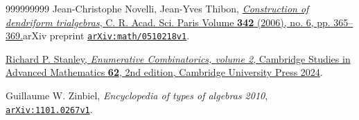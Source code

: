 \documentclass[numbers=enddot,12pt,final,onecolumn,notitlepage,abstracton]{scrartcl}%
\theoremstyle{definition}
\begin{document}
\begin{thebibliography}{999999999}
Jean-Christophe Novelli, Jean-Yves Thibon,
\href{https://www.numdam.org/item/CRMATH_2006__342_6_365_0/}{\textit{Construction
of dendriform trialgebras}, C. R. Acad. Sci. Paris Volume \textbf{342} (2006),
no. 6, pp. 365--369.}\newline arXiv preprint
\texttt{\href{https://arxiv.org/abs/math/0510218v1}{arXiv:math/0510218v1}}.

%
\href{https://doi.org/10.1017/9781009262538}{Richard P. Stanley,
\textit{Enumerative Combinatorics, volume 2}, Cambridge Studies in Advanced
Mathematics \textbf{62}, 2nd edition, Cambridge University Press 2024}.

Guillaume W. Zinbiel, \textit{Encyclopedia of
types of algebras 2010},
\texttt{\href{https://arxiv.org/abs/1101.0267v1}{arXiv:1101.0267v1}}.
\end{thebibliography}
\end{document}
